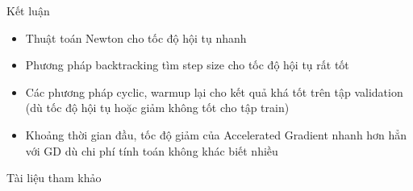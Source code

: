 \documentclass[10pt]{beamer}
\theoremstyle{remark}
\theoremstyle{definition}
\begin{document}
\begin{frame}{Kết luận}
	\begin{itemize}
		\item Thuật toán Newton cho tốc độ hội tụ nhanh
  		\item Phương pháp backtracking tìm step size cho tốc độ hội tụ rất tốt
    	\item Các phương pháp cyclic, warmup lại cho kết quả khá tốt trên tập validation (dù tốc độ hội tụ hoặc giảm không tốt cho tập train)
     	\item Khoảng thời gian đầu, tốc độ giảm của Accelerated Gradient nhanh hơn hẳn với GD dù chi phí tính toán không khác biết nhiều
	\end{itemize}
\end{frame}

\begin{frame}[allowframebreaks]{Tài liệu tham khảo}
    \printbibliography
\end{frame}
\end{document}

